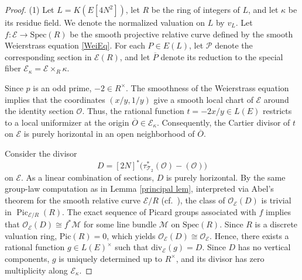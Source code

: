 \documentclass[11pt]{amsart}
\theoremstyle{definition}
\begin{document}
\begin{proof}
\noindent\textup{(1)} Let $L=K(E[4N^{2}])$, let $R$ be the ring of integers of $L$, and let $\kappa$ be its residue field. We denote the normalized valuation on $L$ by $v_L$. Let $f: \mathcal{E} \to \mathrm{Spec}(R)$ be the smooth projective relative curve defined by the smooth Weierstrass equation \eqref{WeiEq}. For each $P\in E(L)$, let $\mathcal{P}$ denote the corresponding section in $\mathcal{E}(R)$, and let $\overline{P}$ denote its reduction to the special fiber $\mathcal{E}_\kappa = \mathcal{E} \times_R \kappa$.

Since $p$ is an odd prime, $-2 \in R^\times$. The smoothness of the Weierstrass equation implies that the coordinates $(x/y, 1/y)$ give a smooth local chart of $\mathcal{E}$ around the identity section $\mathcal{O}$. Thus, the rational function $t = -2x/y \in L(E)$ restricts to a local uniformizer at the origin $\overline{O} \in \mathcal{E}_\kappa$. Consequently, the Cartier divisor of $t$ on $\mathcal{E}$ is purely horizontal in an open neighborhood of $\overline{O}$.


Consider the divisor
\[
  D=[2N]^*\bigl(\tau_{\mathcal{T}_2}^*(\mathcal{O})-(\mathcal{O})\bigr)
\]
on \(\mathcal E\). As a linear combination of sections, \(D\) is
purely horizontal. By the same group-law computation as in
Lemma \ref{principal lem}, interpreted via Abel's theorem for the smooth relative
curve \(\mathcal E/R\) (cf.~\cite[Theorem~2.1.2]{KM85}), the class of
\(\mathcal O_{\mathcal E}(D)\) is trivial in
\(\operatorname{Pic}_{\mathcal E/R}(R)\).
The exact sequence of Picard groups associated with $f$ implies that $\mathcal{O}_{\mathcal{E}}(D) \cong f^*\mathcal{M}$ for some line bundle $\mathcal{M}$ on $\mathrm{Spec}(R)$. Since $R$ is a discrete valuation ring, $\mathrm{Pic}(R) = 0$, which yields $\mathcal{O}_{\mathcal{E}}(D) \cong \mathcal{O}_{\mathcal{E}}$. Hence, there exists a rational function $g \in L(E)^{\times}$ such that $\mathrm{div}_{\mathcal{E}}(g) = D$. Since $D$ has no vertical components, $g$ is uniquely determined up to $R^{\times}$, and its divisor has zero multiplicity along $\mathcal{E}_\kappa$.


\end{proof}
\end{document}
